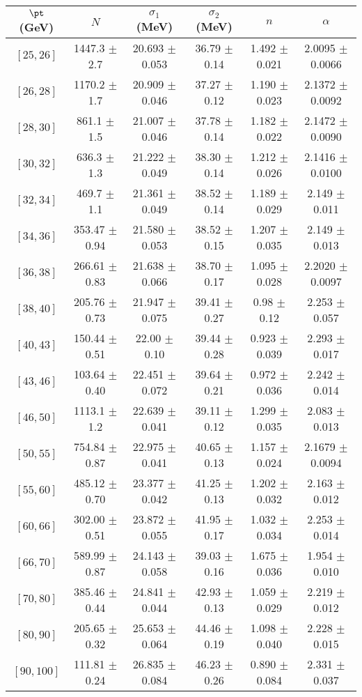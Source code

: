 \begin{tabular}{c||c|c|c|c|c}
$\pt$ (GeV) & $N$ & $\sigma_1$ (MeV) & $\sigma_2$ (MeV) & $n$ & $\alpha$ \\
\hline
$[25, 26]$ & 1447.3 $\pm$ 2.7 & 20.693 $\pm$ 0.053 & 36.79 $\pm$ 0.14 & 1.492 $\pm$ 0.021 & 2.0095 $\pm$ 0.0066\\
$[26, 28]$ & 1170.2 $\pm$ 1.7 & 20.909 $\pm$ 0.046 & 37.27 $\pm$ 0.12 & 1.190 $\pm$ 0.023 & 2.1372 $\pm$ 0.0092\\
$[28, 30]$ & 861.1 $\pm$ 1.5 & 21.007 $\pm$ 0.046 & 37.78 $\pm$ 0.14 & 1.182 $\pm$ 0.022 & 2.1472 $\pm$ 0.0090\\
$[30, 32]$ & 636.3 $\pm$ 1.3 & 21.222 $\pm$ 0.049 & 38.30 $\pm$ 0.14 & 1.212 $\pm$ 0.026 & 2.1416 $\pm$ 0.0100\\
$[32, 34]$ & 469.7 $\pm$ 1.1 & 21.361 $\pm$ 0.049 & 38.52 $\pm$ 0.14 & 1.189 $\pm$ 0.029 & 2.149 $\pm$ 0.011\\
$[34, 36]$ & 353.47 $\pm$ 0.94 & 21.580 $\pm$ 0.053 & 38.52 $\pm$ 0.15 & 1.207 $\pm$ 0.035 & 2.149 $\pm$ 0.013\\
$[36, 38]$ & 266.61 $\pm$ 0.83 & 21.638 $\pm$ 0.066 & 38.70 $\pm$ 0.17 & 1.095 $\pm$ 0.028 & 2.2020 $\pm$ 0.0097\\
$[38, 40]$ & 205.76 $\pm$ 0.73 & 21.947 $\pm$ 0.075 & 39.41 $\pm$ 0.27 & 0.98 $\pm$ 0.12 & 2.253 $\pm$ 0.057\\
$[40, 43]$ & 150.44 $\pm$ 0.51 & 22.00 $\pm$ 0.10 & 39.44 $\pm$ 0.28 & 0.923 $\pm$ 0.039 & 2.293 $\pm$ 0.017\\
$[43, 46]$ & 103.64 $\pm$ 0.40 & 22.451 $\pm$ 0.072 & 39.64 $\pm$ 0.21 & 0.972 $\pm$ 0.036 & 2.242 $\pm$ 0.014\\
$[46, 50]$ & 1113.1 $\pm$ 1.2 & 22.639 $\pm$ 0.041 & 39.11 $\pm$ 0.12 & 1.299 $\pm$ 0.035 & 2.083 $\pm$ 0.013\\
$[50, 55]$ & 754.84 $\pm$ 0.87 & 22.975 $\pm$ 0.041 & 40.65 $\pm$ 0.13 & 1.157 $\pm$ 0.024 & 2.1679 $\pm$ 0.0094\\
$[55, 60]$ & 485.12 $\pm$ 0.70 & 23.377 $\pm$ 0.042 & 41.25 $\pm$ 0.13 & 1.202 $\pm$ 0.032 & 2.163 $\pm$ 0.012\\
$[60, 66]$ & 302.00 $\pm$ 0.51 & 23.872 $\pm$ 0.055 & 41.95 $\pm$ 0.17 & 1.032 $\pm$ 0.034 & 2.253 $\pm$ 0.014\\
$[66, 70]$ & 589.99 $\pm$ 0.87 & 24.143 $\pm$ 0.058 & 39.03 $\pm$ 0.16 & 1.675 $\pm$ 0.036 & 1.954 $\pm$ 0.010\\
$[70, 80]$ & 385.46 $\pm$ 0.44 & 24.841 $\pm$ 0.044 & 42.93 $\pm$ 0.13 & 1.059 $\pm$ 0.029 & 2.219 $\pm$ 0.012\\
$[80, 90]$ & 205.65 $\pm$ 0.32 & 25.653 $\pm$ 0.064 & 44.46 $\pm$ 0.19 & 1.098 $\pm$ 0.040 & 2.228 $\pm$ 0.015\\
$[90, 100]$ & 111.81 $\pm$ 0.24 & 26.835 $\pm$ 0.084 & 46.23 $\pm$ 0.26 & 0.890 $\pm$ 0.084 & 2.331 $\pm$ 0.037\\
\end{tabular}

